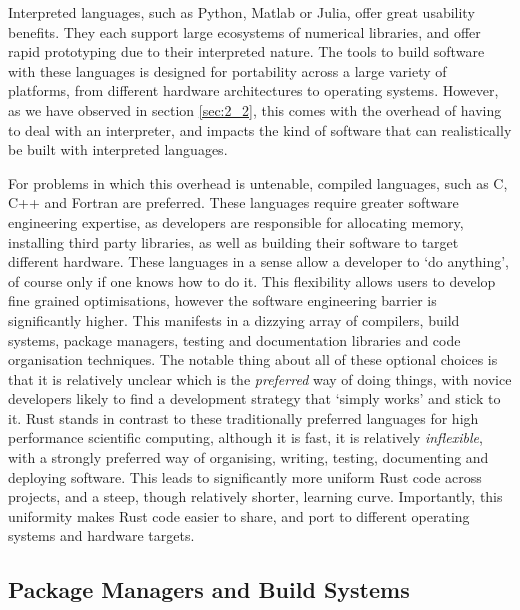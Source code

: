 Interpreted languages, such as Python, Matlab or Julia, offer great usability benefits. They each support large ecosystems of numerical libraries, and offer rapid prototyping due to their interpreted nature. The tools to build software with these languages is designed for portability across a large variety of platforms, from different hardware architectures to operating systems. However, as we have observed in section \ref{sec:2_2}, this comes with the overhead of having to deal with an interpreter, and impacts the kind of software that can realistically be built with interpreted languages.

For problems in which this overhead is untenable, compiled languages, such as C, C++ and Fortran are preferred. These languages require greater software engineering expertise, as developers are responsible for allocating memory, installing third party libraries, as well as building their software to target different hardware. These languages in a sense allow a developer to `do anything', of course only if one knows how to do it. This flexibility allows users to develop fine grained optimisations, however the software engineering barrier is significantly higher. This manifests in a dizzying array of compilers, build systems, package managers, testing and documentation libraries and code organisation techniques. The notable thing about all of these optional choices is that it is relatively unclear which is the \textit{preferred} way of doing things, with novice developers likely to find a development strategy that `simply works' and stick to it. Rust stands in contrast to these traditionally preferred languages for high performance scientific computing, although it is fast, it is relatively \textit{inflexible}, with a strongly preferred way of organising, writing, testing, documenting and deploying software. This leads to significantly more uniform Rust code across projects, and a steep, though relatively shorter, learning curve. Importantly, this uniformity makes Rust code easier to share, and port to different operating systems and hardware targets.

\subsection*{Package Managers and Build Systems}

